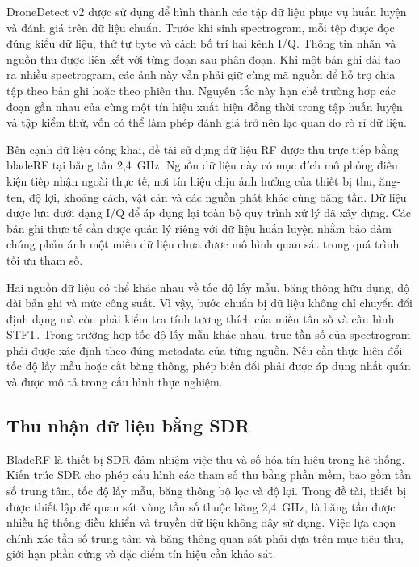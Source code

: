 \documentclass[../DoAn.tex]{subfiles}
\begin{document}
DroneDetect v2 được sử dụng để hình thành các tập dữ liệu phục vụ huấn luyện và đánh giá trên dữ liệu chuẩn. Trước khi sinh spectrogram, mỗi tệp được đọc đúng kiểu dữ liệu, thứ tự byte và cách bố trí hai kênh I/Q. Thông tin nhãn và nguồn thu được liên kết với từng đoạn sau phân đoạn. Khi một bản ghi dài tạo ra nhiều spectrogram, các ảnh này vẫn phải giữ cùng mã nguồn để hỗ trợ chia tập theo bản ghi hoặc theo phiên thu. Nguyên tắc này hạn chế trường hợp các đoạn gần nhau của cùng một tín hiệu xuất hiện đồng thời trong tập huấn luyện và tập kiểm thử, vốn có thể làm phép đánh giá trở nên lạc quan do rò rỉ dữ liệu.

Bên cạnh dữ liệu công khai, đề tài sử dụng dữ liệu RF được thu trực tiếp bằng bladeRF tại băng tần 2,4~GHz. Nguồn dữ liệu này có mục đích mô phỏng điều kiện tiếp nhận ngoài thực tế, nơi tín hiệu chịu ảnh hưởng của thiết bị thu, ăng-ten, độ lợi, khoảng cách, vật cản và các nguồn phát khác cùng băng tần. Dữ liệu được lưu dưới dạng I/Q để áp dụng lại toàn bộ quy trình xử lý đã xây dựng. Các bản ghi thực tế cần được quản lý riêng với dữ liệu huấn luyện nhằm bảo đảm chúng phản ánh một miền dữ liệu chưa được mô hình quan sát trong quá trình tối ưu tham số.

Hai nguồn dữ liệu có thể khác nhau về tốc độ lấy mẫu, băng thông hữu dụng, độ dài bản ghi và mức công suất. Vì vậy, bước chuẩn bị dữ liệu không chỉ chuyển đổi định dạng mà còn phải kiểm tra tính tương thích của miền tần số và cấu hình STFT. Trong trường hợp tốc độ lấy mẫu khác nhau, trục tần số của spectrogram phải được xác định theo đúng metadata của từng nguồn. Nếu cần thực hiện đổi tốc độ lấy mẫu hoặc cắt băng thông, phép biến đổi phải được áp dụng nhất quán và được mô tả trong cấu hình thực nghiệm.

\subsection{Thu nhận dữ liệu bằng SDR}

BladeRF là thiết bị SDR đảm nhiệm việc thu và số hóa tín hiệu trong hệ thống. Kiến trúc SDR cho phép cấu hình các tham số thu bằng phần mềm, bao gồm tần số trung tâm, tốc độ lấy mẫu, băng thông bộ lọc và độ lợi. Trong đề tài, thiết bị được thiết lập để quan sát vùng tần số thuộc băng 2,4~GHz, là băng tần được nhiều hệ thống điều khiển và truyền dữ liệu không dây sử dụng. Việc lựa chọn chính xác tần số trung tâm và băng thông quan sát phải dựa trên mục tiêu thu, giới hạn phần cứng và đặc điểm tín hiệu cần khảo sát.
\end{document}
